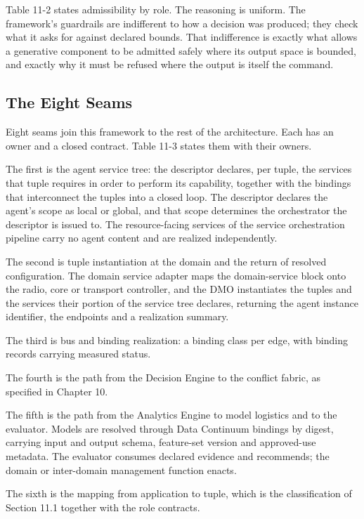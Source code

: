 Table 11-2 states admissibility by role. The reasoning is uniform. The
framework's guardrails are indifferent to how a decision was produced;
they check what it asks for against declared bounds. That indifference
is exactly what allows a generative component to be admitted safely
where its output space is bounded, and exactly why it must be refused
where the output is itself the command.

\hypertarget{the-eight-seams}{%
\subsection{The Eight Seams}\label{the-eight-seams}}

Eight seams join this framework to the rest of the architecture. Each
has an owner and a closed contract. Table 11-3 states them with their
owners.

The first is the agent service tree: the descriptor declares, per tuple,
the services that tuple requires in order to perform its capability,
together with the bindings that interconnect the tuples into a closed
loop. The descriptor declares the agent's scope as local or global, and
that scope determines the orchestrator the descriptor is issued to. The
resource-facing services of the service orchestration pipeline carry no
agent content and are realized independently.

The second is tuple instantiation at the domain and the return of
resolved configuration. The domain service adapter maps the
domain-service block onto the radio, core or transport controller, and
the DMO instantiates the tuples and the services their portion of the
service tree declares, returning the agent instance identifier, the
endpoints and a realization summary.

The third is bus and binding realization: a binding class per edge, with
binding records carrying measured status.

The fourth is the path from the Decision Engine to the conflict fabric,
as specified in Chapter 10.

The fifth is the path from the Analytics Engine to model logistics and
to the evaluator. Models are resolved through Data Continuum bindings by
digest, carrying input and output schema, feature-set version and
approved-use metadata. The evaluator consumes declared evidence and
recommends; the domain or inter-domain management function enacts.

The sixth is the mapping from application to tuple, which is the
classification of Section 11.1 together with the role contracts.

